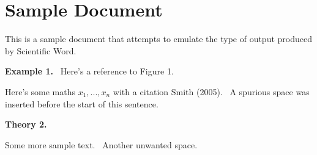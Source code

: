 \documentclass[twoside,11pt]{article}
\begin{document}
\section{Sample Document}

\bigskip

This is a sample document that attempts to emulate the type of
output produced by Scientific Word.

\bigskip

\textbf{Example 1.} \ Here's a reference to Figure 1.


Here's some maths $x_1,...,x_n$ with a citation Smith (2005). \ A
spurious space was inserted before the start of this sentence.

\bigskip

\noindent \textbf{Theory 2.}

\noindent Some more sample text. \ Another unwanted space.

\nocite{Smith2005}

\bigskip



\end{document}
